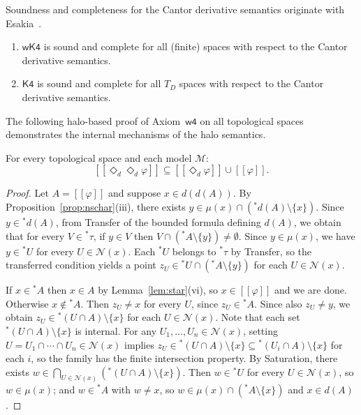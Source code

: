 \documentclass[submission,copyright,creativecommons]{eptcs}
\newcommand{\sem}[1]{[\![#1]\!]}
\newcommand{\diam}{\Diamond}
\newcommand{\Nbd}{\mathcal{N}}
\newcommand{\str}{{{}^{*}\!}}
\begin{document}
Soundness and completeness for the Cantor derivative semantics originate with Esakia~\cite{Esakia1981}. 

\begin{theorem}
\label{thm:soundd}
\mbox{}
\begin{enumerate}[label=\textup{(\roman*)}]
  \item $\mathsf{wK4}$ is sound and complete for all (finite)  spaces with respect to the Cantor derivative semantics. 
  \item $\mathsf{K4}$ is sound and complete for all $T_D$
    spaces with respect to the Cantor derivative semantics.
\end{enumerate}
\end{theorem}

The following halo-based proof of Axiom~$\mathsf{w4}$ on all topological spaces demonstrates the internal mechanisms of the halo semantics.

\begin{proposition}
\label{thm:wK4}
For every topological space and each model $\mathcal{M}$:
\[
  \sem{\diam_d\diam_d\varphi} \subseteq \sem{\diam_d\varphi} \cup \sem{\varphi}.
\]
\end{proposition}
\begin{proof}
Let $A = \sem{\varphi}$ and suppose $x \in d(d(A))$.
By Proposition~\ref{prop:nschar}(iii), there exists $y \in \mu(x) \cap (\str d(A) \setminus \{x\})$.
Since $y \in \str d(A)$, from Transfer of the bounded formula defining $d(A)$, we obtain that for every $V \in \str\tau$, if $y \in V$ then $V \cap (\str A \setminus \{y\}) \neq \emptyset$.
Since $y \in \mu(x)$, we have $y \in \str U$ for every $U \in \Nbd(x)$.
Each $\str U$ belongs to $\str\tau$ by Transfer, so the transferred condition yields a point $z_U \in \str U \cap (\str A \setminus \{y\})$ for each $U \in \Nbd(x)$.

If $x \in \str A$ then $x \in A$ by Lemma~\ref{lem:star}(vi), so $x \in \sem{\varphi}$ and we are done.
Otherwise $x \notin \str A$.
Then $z_U \neq x$ for every $U$, since $z_U \in \str A$.
Since also $z_U \neq y$, we obtain $z_U \in \str(U \cap A) \setminus \{x\}$ for each $U \in \Nbd(x)$.
Note that each set $\str(U \cap A) \setminus \{x\}$ is internal. 
For any $U_1, \ldots, U_n \in \Nbd(x)$, setting $U = U_1 \cap \cdots \cap U_n \in \Nbd(x)$ implies $z_U \in \str(U \cap A) \setminus \{x\} \subseteq \str(U_i \cap A) \setminus \{x\}$ for each $i$, so the family has the finite intersection property.
By Saturation, there exists $w \in \bigcap_{U \in \Nbd(x)} (\str(U \cap A) \setminus \{x\})$.
Then $w \in \str U$ for every $U \in \Nbd(x)$, so $w \in \mu(x)$; and $w \in \str A$ with $w \neq x$, so $w \in \mu(x) \cap (\str A \setminus \{x\})$ and $x \in d(A)$.
\end{proof}
\end{document}
